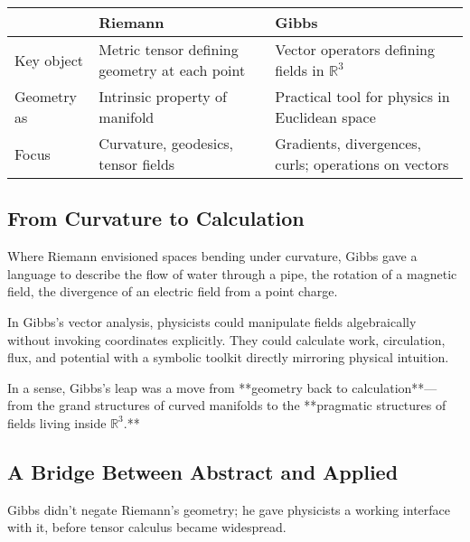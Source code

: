 \begin{tcolorbox}[colback=gray!5!white, colframe=black, title=\textbf{Sidebar: The Shift from Riemann to Gibbs}, fonttitle=\bfseries, arc=1.5mm, boxrule=0.4pt]

\begin{tabular}{>{\raggedright}p{4cm} >{\raggedright}p{5.5cm} >{\raggedright\arraybackslash}p{5.5cm}}
 & \textbf{Riemann} & \textbf{Gibbs} \\
\midrule
Key object & Metric tensor defining geometry at each point & Vector operators defining fields in \( \mathbb{R}^3 \) \\
Geometry as & Intrinsic property of manifold & Practical tool for physics in Euclidean space \\
Focus & Curvature, geodesics, tensor fields & Gradients, divergences, curls; operations on vectors
\end{tabular}

\end{tcolorbox}

\bigskip

\subsection*{From Curvature to Calculation}

Where Riemann envisioned spaces bending under curvature,  
Gibbs gave a language to describe the flow of water through a pipe,  
the rotation of a magnetic field,  
the divergence of an electric field from a point charge.

In Gibbs’s vector analysis, physicists could manipulate fields algebraically without invoking coordinates explicitly.  
They could calculate work, circulation, flux, and potential with a symbolic toolkit directly mirroring physical intuition.

In a sense, Gibbs’s leap was a move from **geometry back to calculation**—  
from the grand structures of curved manifolds to the **pragmatic structures of fields living inside \( \mathbb{R}^3 \).**

\bigskip

\subsection*{A Bridge Between Abstract and Applied}

Gibbs didn’t negate Riemann’s geometry; he gave physicists a working interface with it,  
before tensor calculus became widespread.

